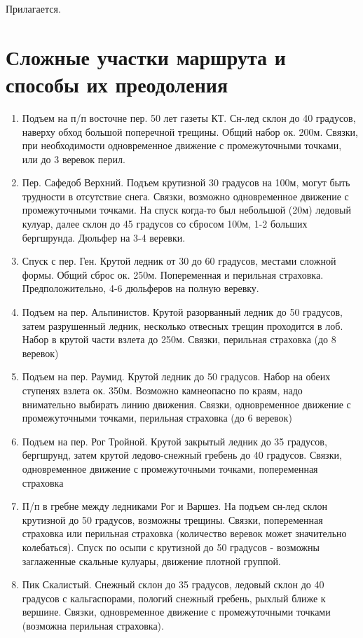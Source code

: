 \documentclass[a5paper, 12pt, twoside]{article}
\begin{document}
        Прилагается.

\newpage %
    
    \section[]{Сложные участки маршрута и способы их преодоления}
        
        {\footnotesize%
        \begin{enumerate}
            \item Подъем на п/п восточне пер. 50 лет газеты КТ. Сн-лед склон до 40 градусов, наверху обход большой поперечной трещины. Общий набор ок. 200м. Связки, при необходимости од\-но\-вре\-мен\-ное движение с промежуточными точками, или до 3 веревок перил.
            \item Пер. Сафедоб Верхний. Подъем крутизной 30 градусов на 100м, могут быть трудности в отсутствие снега. Связки, возможно одновременное движение с промежуточными точками. На спуск когда-то был небольшой (20м) ледовый кулуар, далее склон до 45 градусов со сбросом 100м, 1-2 больших бергшрунда. Дюльфер на 3-4 веревки.
            \item Спуск с пер. Ген. Крутой ледник от 30 до 60 градусов, местами сложной формы. Общий сброс ок. 250м. Попеременная и перильная страховка. Предположительно, 4-6 дюльферов на полную веревку.
            \item Подъем на пер. Альпинистов. Крутой разорванный ледник до 50 градусов, затем разрушенный ледник, несколько отвесных трещин проходится в лоб. Набор в крутой части взлета до 250м. Связки, перильная страховка (до 8 веревок)
            \item Подъем на пер. Раумид. Крутой ледник до 50 градусов. Набор на обеих ступенях взлета ок. 350м. Возможно камнеопасно по краям, надо внимательно выбирать линию движения. Связки, одновременное движение с промежуточными точками, перильная страховка (до 6 веревок)
            \item Подъем на пер. Рог Тройной. Крутой закрытый ледник до 35 градусов, бергшрунд, затем крутой ледово-снежный гребень до 40 градусов. Связки, одновременное движение с промежуточными точками, попеременная страховка
            \item П/п в гребне между ледниками Рог и Варшез. На подъем сн-лед склон крутизной до 50 градусов, возможны трещины. Связки, попеременная страховка или перильная страховка (количество веревок может значительно колебаться). Спуск по осыпи с крутизной до 50 градусов - возможны заглаженные скальные кулуары, движение плотной группой.
            \item Пик Скалистый. Снежный склон до 35 градусов, ледовый склон до 40 градусов с кальгаспорами, пологий снежный гребень, рыхлый ближе к вершине. Связки, одновременное движение с промежуточными точками (возможна перильная страховка).
        \end{enumerate}}
\end{document}
